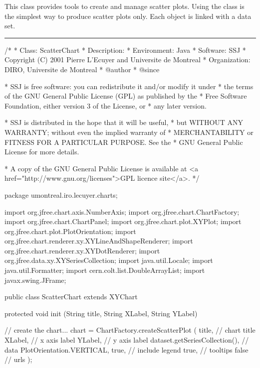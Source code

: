 
This class provides tools to create and manage scatter plots. Using the
 class is the simplest way to produce scatter plots only.
Each  object is linked with a
 data set.

\bigskip\hrule
\begin{code}
\begin{hide}
/*
 * Class:        ScatterChart
 * Description:  
 * Environment:  Java
 * Software:     SSJ 
 * Copyright (C) 2001  Pierre L'Ecuyer and Universite de Montreal
 * Organization: DIRO, Universite de Montreal
 * @author       
 * @since

 * SSJ is free software: you can redistribute it and/or modify it under
 * the terms of the GNU General Public License (GPL) as published by the
 * Free Software Foundation, either version 3 of the License, or
 * any later version.

 * SSJ is distributed in the hope that it will be useful,
 * but WITHOUT ANY WARRANTY; without even the implied warranty of
 * MERCHANTABILITY or FITNESS FOR A PARTICULAR PURPOSE.  See the
 * GNU General Public License for more details.

 * A copy of the GNU General Public License is available at
   <a href="http://www.gnu.org/licenses">GPL licence site</a>.
 */
\end{hide}
package umontreal.iro.lecuyer.charts;\begin{hide}

import   org.jfree.chart.axis.NumberAxis;
import   org.jfree.chart.ChartFactory;
import   org.jfree.chart.ChartPanel;
import   org.jfree.chart.plot.XYPlot;
import   org.jfree.chart.plot.PlotOrientation;
import   org.jfree.chart.renderer.xy.XYLineAndShapeRenderer;
import   org.jfree.chart.renderer.xy.XYDotRenderer;
import   org.jfree.data.xy.XYSeriesCollection;
import   java.util.Locale;
import   java.util.Formatter;
import   cern.colt.list.DoubleArrayList;
import   javax.swing.JFrame;
\end{hide}

public class ScatterChart extends XYChart \begin{hide} {

   protected void init (String title, String XLabel, String YLabel) {
      // create the chart...
      chart = ChartFactory.createScatterPlot (
         title,                    // chart title
         XLabel,                   // x axis label
         YLabel,                   // y axis label
         dataset.getSeriesCollection(), // data
         PlotOrientation.VERTICAL,
         true,                     // include legend
         true,                     // tooltips
         false                     // urls
      );

}}
\end{hide}
\end{code}

